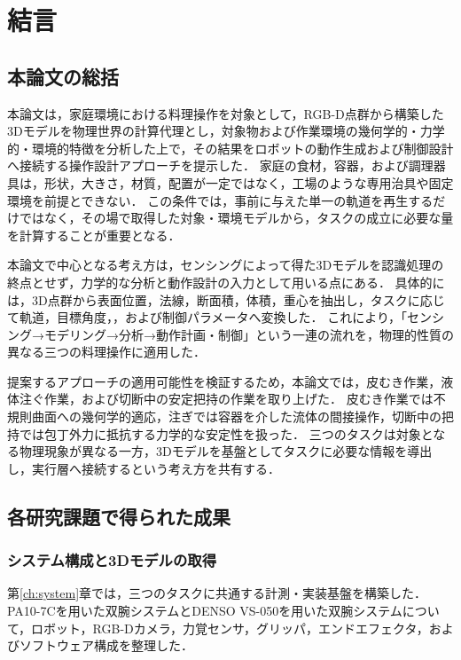 \chapter{結言}
\label{chap:conclusion}

\section{本論文の総括}
\label{sec:conclusion_overview}

本論文は，家庭環境における料理操作を対象として，RGB-D点群から構築した3Dモデルを物理世界の計算代理とし，対象物および作業環境の幾何学的・力学的・環境的特徴を分析した上で，その結果をロボットの動作生成および制御設計へ接続する操作設計アプローチを提示した．
家庭の食材，容器，および調理器具は，形状，大きさ，材質，配置が一定ではなく，工場のような専用治具や固定環境を前提とできない．
この条件では，事前に与えた単一の軌道を再生するだけではなく，その場で取得した対象・環境モデルから，タスクの成立に必要な量を計算することが重要となる．

本論文で中心となる考え方は，センシングによって得た3Dモデルを認識処理の終点とせず，力学的な分析と動作設計の入力として用いる点にある．
具体的には，3D点群から表面位置，法線，断面積，体積，重心を抽出し，タスクに応じて軌道，目標角度，{\nameholdingpointset}，および制御パラメータへ変換した．
これにより，「センシング→モデリング→分析→動作計画・制御」という一連の流れを，物理的性質の異なる三つの料理操作に適用した．

提案するアプローチの適用可能性を検証するため，本論文では，皮むき作業，液体注ぐ作業，および切断中の安定把持の作業を取り上げた．
皮むき作業では不規則曲面への幾何学的適応，注ぎでは容器を介した流体の間接操作，切断中の把持では包丁外力に抵抗する力学的な安定性を扱った．
三つのタスクは対象となる物理現象が異なる一方，3Dモデルを基盤としてタスクに必要な情報を導出し，実行層へ接続するという考え方を共有する．

\section{各研究課題で得られた成果}
\label{sec:conclusion_results}

\subsection{システム構成と3Dモデルの取得}
\label{subsec:conclusion_common_model}

第\ref{ch:system}章では，三つのタスクに共通する計測・実装基盤を構築した．PA10-7Cを用いた双腕システムとDENSO VS-050を用いた双腕システムについて，ロボット，RGB-Dカメラ，力覚センサ，グリッパ，エンドエフェクタ，およびソフトウェア構成を整理した．

